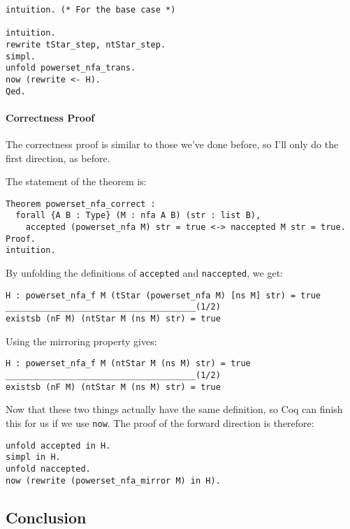 \begin{verbatim}
intuition. (* For the base case *)

intuition.
rewrite tStar_step, ntStar_step.
simpl.
unfold powerset_nfa_trans.
now (rewrite <- H).
Qed.
\end{verbatim}

\paragraph{Correctness Proof}

The correctness proof is similar to those we've done before, so I'll only do the first direction, as before.

The statement of the theorem is:

\begin{verbatim}
Theorem powerset_nfa_correct :
  forall {A B : Type} (M : nfa A B) (str : list B),
    accepted (powerset_nfa M) str = true <-> naccepted M str = true.
Proof.
intuition.
\end{verbatim}

By unfolding the definitions of \texttt{accepted} and \texttt{naccepted}, we get:

\begin{verbatim}
H : powerset_nfa_f M (tStar (powerset_nfa M) [ns M] str) = true
______________________________________(1/2)
existsb (nF M) (ntStar M (ns M) str) = true
\end{verbatim}

Using the mirroring property gives:

\begin{verbatim}
H : powerset_nfa_f M (ntStar M (ns M) str) = true
______________________________________(1/2)
existsb (nF M) (ntStar M (ns M) str) = true
\end{verbatim}

Now that these two things actually have the same definition, so Coq can finish this for us if we use \texttt{now}.
The proof of the forward direction is therefore:

\begin{verbatim}
unfold accepted in H.
simpl in H.
unfold naccepted.
now (rewrite (powerset_nfa_mirror M) in H).
\end{verbatim}

\subsection{Conclusion}

